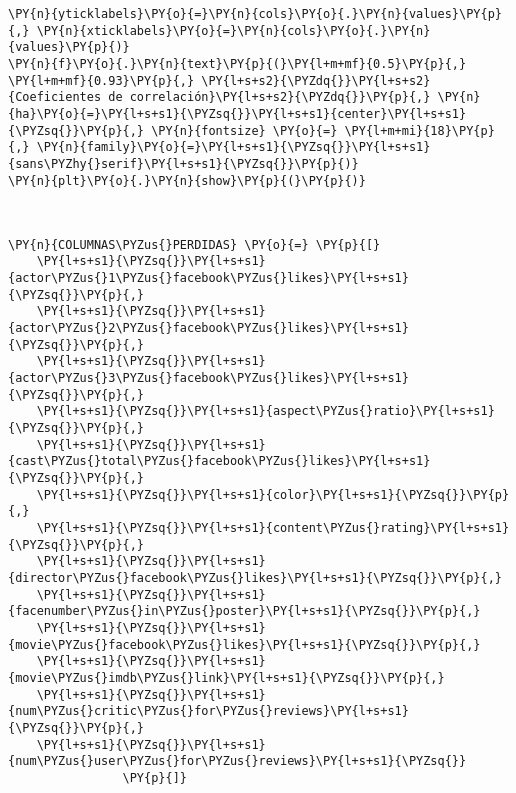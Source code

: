 \begin{tcolorbox}[breakable, size=fbox, boxrule=1pt, pad at break*=1mm,colback=cellbackground, colframe=cellborder]
\begin{Verbatim}[commandchars=\\\{\}]
                 \PY{n}{yticklabels}\PY{o}{=}\PY{n}{cols}\PY{o}{.}\PY{n}{values}\PY{p}{,} \PY{n}{xticklabels}\PY{o}{=}\PY{n}{cols}\PY{o}{.}\PY{n}{values}\PY{p}{)}
\PY{n}{f}\PY{o}{.}\PY{n}{text}\PY{p}{(}\PY{l+m+mf}{0.5}\PY{p}{,} \PY{l+m+mf}{0.93}\PY{p}{,} \PY{l+s+s2}{\PYZdq{}}\PY{l+s+s2}{Coeficientes de correlación}\PY{l+s+s2}{\PYZdq{}}\PY{p}{,} \PY{n}{ha}\PY{o}{=}\PY{l+s+s1}{\PYZsq{}}\PY{l+s+s1}{center}\PY{l+s+s1}{\PYZsq{}}\PY{p}{,} \PY{n}{fontsize} \PY{o}{=} \PY{l+m+mi}{18}\PY{p}{,} \PY{n}{family}\PY{o}{=}\PY{l+s+s1}{\PYZsq{}}\PY{l+s+s1}{sans\PYZhy{}serif}\PY{l+s+s1}{\PYZsq{}}\PY{p}{)}
\PY{n}{plt}\PY{o}{.}\PY{n}{show}\PY{p}{(}\PY{p}{)}
\end{Verbatim}
\end{tcolorbox}

    \begin{center}
    \end{center}
    { \hspace*{\fill} \\}
    
    \begin{tcolorbox}[breakable, size=fbox, boxrule=1pt, pad at break*=1mm,colback=cellbackground, colframe=cellborder]
\begin{Verbatim}[commandchars=\\\{\}]
\PY{n}{COLUMNAS\PYZus{}PERDIDAS} \PY{o}{=} \PY{p}{[}
    \PY{l+s+s1}{\PYZsq{}}\PY{l+s+s1}{actor\PYZus{}1\PYZus{}facebook\PYZus{}likes}\PY{l+s+s1}{\PYZsq{}}\PY{p}{,}
    \PY{l+s+s1}{\PYZsq{}}\PY{l+s+s1}{actor\PYZus{}2\PYZus{}facebook\PYZus{}likes}\PY{l+s+s1}{\PYZsq{}}\PY{p}{,}
    \PY{l+s+s1}{\PYZsq{}}\PY{l+s+s1}{actor\PYZus{}3\PYZus{}facebook\PYZus{}likes}\PY{l+s+s1}{\PYZsq{}}\PY{p}{,}
    \PY{l+s+s1}{\PYZsq{}}\PY{l+s+s1}{aspect\PYZus{}ratio}\PY{l+s+s1}{\PYZsq{}}\PY{p}{,}
    \PY{l+s+s1}{\PYZsq{}}\PY{l+s+s1}{cast\PYZus{}total\PYZus{}facebook\PYZus{}likes}\PY{l+s+s1}{\PYZsq{}}\PY{p}{,}
    \PY{l+s+s1}{\PYZsq{}}\PY{l+s+s1}{color}\PY{l+s+s1}{\PYZsq{}}\PY{p}{,}
    \PY{l+s+s1}{\PYZsq{}}\PY{l+s+s1}{content\PYZus{}rating}\PY{l+s+s1}{\PYZsq{}}\PY{p}{,}
    \PY{l+s+s1}{\PYZsq{}}\PY{l+s+s1}{director\PYZus{}facebook\PYZus{}likes}\PY{l+s+s1}{\PYZsq{}}\PY{p}{,}
    \PY{l+s+s1}{\PYZsq{}}\PY{l+s+s1}{facenumber\PYZus{}in\PYZus{}poster}\PY{l+s+s1}{\PYZsq{}}\PY{p}{,}
    \PY{l+s+s1}{\PYZsq{}}\PY{l+s+s1}{movie\PYZus{}facebook\PYZus{}likes}\PY{l+s+s1}{\PYZsq{}}\PY{p}{,}
    \PY{l+s+s1}{\PYZsq{}}\PY{l+s+s1}{movie\PYZus{}imdb\PYZus{}link}\PY{l+s+s1}{\PYZsq{}}\PY{p}{,}
    \PY{l+s+s1}{\PYZsq{}}\PY{l+s+s1}{num\PYZus{}critic\PYZus{}for\PYZus{}reviews}\PY{l+s+s1}{\PYZsq{}}\PY{p}{,}
    \PY{l+s+s1}{\PYZsq{}}\PY{l+s+s1}{num\PYZus{}user\PYZus{}for\PYZus{}reviews}\PY{l+s+s1}{\PYZsq{}}
                \PY{p}{]}
\end{Verbatim}
\end{tcolorbox}

